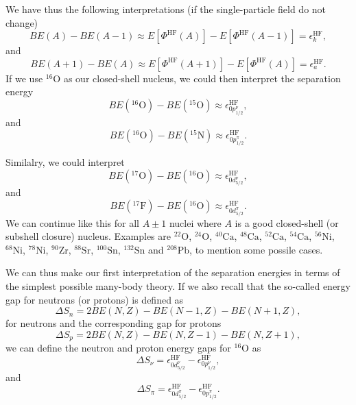 \documentclass[%
twoside,                 %
final,                   %
10pt]{article}
\begin{document}
We have thus the following interpretations (if the single-particle field do not change)
\[
BE(A)-BE(A-1)\approx  E[\Phi^{\mathrm{HF}}(A)]-   E[\Phi^{\mathrm{HF}}(A-1)] 
  = \epsilon_k^{\mathrm{HF}}, 
\]
and
\[
BE(A+1)-BE(A)\approx  E[\Phi^{\mathrm{HF}}(A+1)]-   E[\Phi^{\mathrm{HF}}(A)] =  \epsilon_a^{\mathrm{HF}}. 
\]
If  we use ${}^{16}\mbox{O}$ as our closed-shell nucleus, we could then interpret the separation energy
\[
BE(^{16}\mathrm{O})-BE(^{15}\mathrm{O})\approx \epsilon_{0p^{\nu}_{1/2}}^{\mathrm{HF}}, 
\]
and
\[
BE(^{16}\mathrm{O})-BE(^{15}\mathrm{N})\approx \epsilon_{0p^{\pi}_{1/2}}^{\mathrm{HF}}.
\]




Similalry, we could interpret
\[
BE(^{17}\mathrm{O})-BE(^{16}\mathrm{O})\approx \epsilon_{0d^{\nu}_{5/2}}^{\mathrm{HF}}, 
\]
and 
\[
BE(^{17}\mathrm{F})-BE(^{16}\mathrm{O})\approx\epsilon_{0d^{\pi}_{5/2}}^{\mathrm{HF}}.
\]
We can continue like this for all $A\pm 1$ nuclei where $A$ is a good closed-shell (or subshell closure)
nucleus. Examples are ${}^{22}\mbox{O}$, ${}^{24}\mbox{O}$, ${}^{40}\mbox{Ca}$, ${}^{48}\mbox{Ca}$, ${}^{52}\mbox{Ca}$, ${}^{54}\mbox{Ca}$, ${}^{56}\mbox{Ni}$, 
${}^{68}\mbox{Ni}$, ${}^{78}\mbox{Ni}$, ${}^{90}\mbox{Zr}$, ${}^{88}\mbox{Sr}$, ${}^{100}\mbox{Sn}$, ${}^{132}\mbox{Sn}$ and ${}^{208}\mbox{Pb}$, to mention some possile cases.




We can thus make our first interpretation of the separation energies in terms of the simplest
possible many-body theory. 
If we also recall that the so-called energy gap for neutrons (or protons) is defined as
\[
\Delta S_n= 2BE(N,Z)-BE(N-1,Z)-BE(N+1,Z),
\]
for neutrons and the corresponding gap for protons
\[
\Delta S_p= 2BE(N,Z)-BE(N,Z-1)-BE(N,Z+1),
\]
we can define the neutron and proton energy gaps for ${}^{16}\mbox{O}$ as
\[
\Delta S_{\nu}=\epsilon_{0d^{\nu}_{5/2}}^{\mathrm{HF}}-\epsilon_{0p^{\nu}_{1/2}}^{\mathrm{HF}}, 
\]
and 
\[
\Delta S_{\pi}=\epsilon_{0d^{\pi}_{5/2}}^{\mathrm{HF}}-\epsilon_{0p^{\pi}_{1/2}}^{\mathrm{HF}}. 
\]












\printindex
\end{document}
